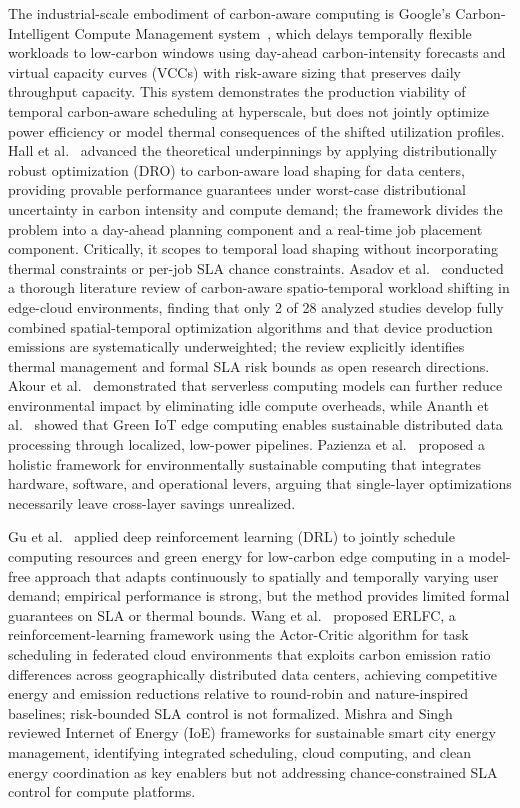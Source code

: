 \documentclass[a4paper,fleqn]{cas-dc}
\begin{document}
The industrial-scale embodiment of carbon-aware computing is Google's Carbon-Intelligent Compute Management system~\cite{ref-radovanovic21}, which delays temporally flexible workloads to low-carbon windows using day-ahead carbon-intensity forecasts and virtual capacity curves (VCCs) with risk-aware sizing that preserves daily throughput capacity. This system demonstrates the production viability of temporal carbon-aware scheduling at hyperscale, but does not jointly optimize power efficiency or model thermal consequences of the shifted utilization profiles. Hall et al.~\cite{ref-hall24} advanced the theoretical underpinnings by applying distributionally robust optimization (DRO) to carbon-aware load shaping for data centers, providing provable performance guarantees under worst-case distributional uncertainty in carbon intensity and compute demand; the framework divides the problem into a day-ahead planning component and a real-time job placement component. Critically, it scopes to temporal load shaping without incorporating thermal constraints or per-job SLA chance constraints. Asadov et al.~\cite{ref-asadov25} conducted a thorough literature review of carbon-aware spatio-temporal workload shifting in edge-cloud environments, finding that only 2 of 28 analyzed studies develop fully combined spatial-temporal optimization algorithms and that device production emissions are systematically underweighted; the review explicitly identifies thermal management and formal SLA risk bounds as open research directions. Akour et al.~\cite{ref-akour25} demonstrated that serverless computing models can further reduce environmental impact by eliminating idle compute overheads, while Ananth et al.~\cite{ref-ananth23} showed that Green IoT edge computing enables sustainable distributed data processing through localized, low-power pipelines. Pazienza et al.~\cite{ref-pazienza24} proposed a holistic framework for environmentally sustainable computing that integrates hardware, software, and operational levers, arguing that single-layer optimizations necessarily leave cross-layer savings unrealized.

Gu et al.~\cite{ref-gu23} applied deep reinforcement learning (DRL) to jointly schedule computing resources and green energy for low-carbon edge computing in a model-free approach that adapts continuously to spatially and temporally varying user demand; empirical performance is strong, but the method provides limited formal guarantees on SLA or thermal bounds. Wang et al.~\cite{ref-wang23-rl} proposed ERLFC, a reinforcement-learning framework using the Actor-Critic algorithm for task scheduling in federated cloud environments that exploits carbon emission ratio differences across geographically distributed data centers, achieving competitive energy and emission reductions relative to round-robin and nature-inspired baselines; risk-bounded SLA control is not formalized. Mishra and Singh~\cite{ref-mishra23} reviewed Internet of Energy (IoE) frameworks for sustainable smart city energy management, identifying integrated scheduling, cloud computing, and clean energy coordination as key enablers but not addressing chance-constrained SLA control for compute platforms.
\end{document}
